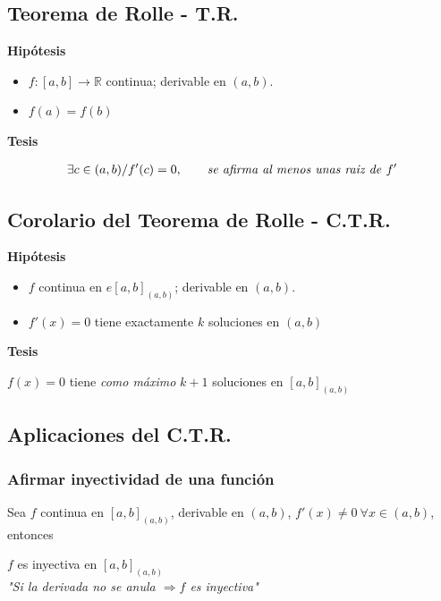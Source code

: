 \documentclass[11pt,titlepage]{article}
\newcommand{\littleTitle}[1]{
	\noindent \ignorespaces
	\small \textbf{#1} \normalsize
	\ignorespaces \ignorespacesafterend
}
\begin{document}
\subsection{Teorema de Rolle - T.R.}
\begin{commBoxy}
	\littleTitle{Hipótesis}
	\begin{itemize}
		\item $f: [a,b] \to \mathbb{R}$ continua; derivable en $(a,b)$.
		\item $f(a) = f(b)$
	\end{itemize}
	
	\littleTitle{Tesis}
	\begin{gather*}
		\exists c \in (a,b) / f'(c) = 0, \qquad \text{\emph{se afirma al menos unas raiz de }$f'$}
	\end{gather*}
\end{commBoxy}

\subsection{Corolario del Teorema de Rolle - C.T.R.} \label{ctr}
\begin{commBoxy}
	\littleTitle{Hipótesis}
	\begin{itemize}
		\item $f$ continua en $e{[a,b]}_{(a,b)}$; derivable en $(a,b)$.
		\item $f'(x) = 0$ tiene exactamente $k$ soluciones en $(a,b)$
	\end{itemize}

	\littleTitle{Tesis}\par
	\begin{center}
		$f(x) = 0$ tiene \emph{como máximo} $k + 1$ soluciones en ${[a,b]}_{(a,b)}$
	\end{center}
\end{commBoxy}

\subsection{Aplicaciones del C.T.R.}
\subsubsection{Afirmar inyectividad de una función}
Sea $f$ continua en ${[a,b]}_{(a,b)}$, derivable en $(a,b)$, $f'(x) \neq 0 \ \forall x \in (a,b)$, entonces
\begin{center}
	\vspace{0.25cm}
	$f$ es inyectiva en ${[a,b]}_{(a,b)}$ \\
	\vspace{0.25cm}
	\emph{"Si la derivada no se anula $\Rightarrow f$ es inyectiva"}
\end{center}
\end{document}
